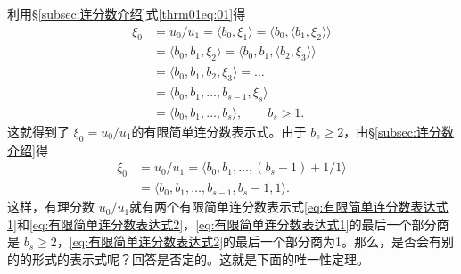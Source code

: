 \begin{theorem}
	利用\S \ref{subsec:连分数介绍}式\eqref{thrm01eq:01}得
	\begin{align}
		\xi_0 & = u_0 / u_1 = \langle b_0, \xi_1 \rangle = \langle b_0, \langle b_1, \xi_2 \rangle \rangle \nonumber \\
		      & = \langle b_0, b_1, \xi_2 \rangle = \langle b_0, b_1, \langle b_2, \xi_3 \rangle \rangle   \nonumber \\
		      & = \langle b_0, b_1, b_2, \xi_3 \rangle = \dots \nonumber                                             \\
		      & = \langle b_0, b_1, \dots, b_{s-1}, \xi_s \rangle \nonumber                                          \\
		      & = \langle b_0, b_1, \dots, b_s \rangle, \qquad b_s > 1. \label{eq:有限简单连分数表达式1}
	\end{align}
	这就得到了 \( \xi_0 = u_0 / u_1 \)的有限简单连分数表示式。由于 \( b_s \ge 2 \)，由\S \ref{subsec:连分数介绍}得
	\begin{align}
		\xi_0 & = u_0 / u_1 = \langle b_0, b_1, \dots, (b_s - 1) + 1/1 \rangle\nonumber                  \\
		      & = \langle b_0, b_1, \dots, b_{s-1}, b_s - 1, 1 \rangle. \label{eq:有限简单连分数表达式2}
	\end{align}
	这样，有理分数 \( u_0 / u_1
	\)就有两个有限简单连分数表示式\eqref{eq:有限简单连分数表达式1}和\eqref{eq:有限简单连分数表达式2}，\eqref{eq:有限简单连分数表达式1}的最后一个部分商是
	\( b_s \ge 2
	\)，\eqref{eq:有限简单连分数表达式2}的最后一个部分商为1。那么，是否会有别的的形式的表示式呢？回答是否定的。这就是下面的唯一性定理。
\end{theorem}

